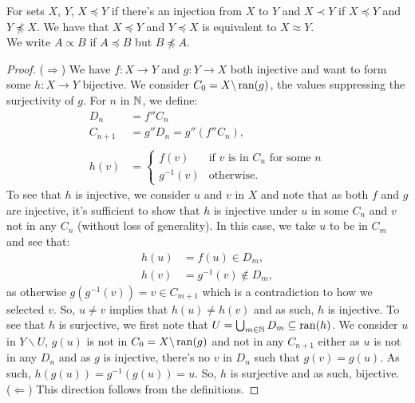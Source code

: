 For sets $X$, $Y$, $X \preceq Y$ if there's an injection from $X$ to $Y$
and $X \prec Y$ if $X \preceq Y$ and $Y \npreceq X$.
We have that $X \preceq Y$ and $Y \preceq X$ is equivalent
to $X \approx Y$.
\\[\baselineskip]
We write $A \propto B$ if $A \preceq B$ but $B \npreceq A$.

\newpage

\begin{proof}
    ($\Rightarrow$) We have $f : X \to Y$ and $g : Y \to X$ both
    injective and want to form some $h : X \to Y$ bijective.
    We consider $C_0 = X \backslash \operatorname{ran}(g)$, the values suppressing
    the surjectivity of $g$. For $n$ in $\mathbb{N}$, we define: \begin{align*}
        D_{n}     &= f''C_n \\
        C_{n + 1} &= g''D_n = g''(f''C_n), \\
        \\
        h(v) &= \begin{cases}
            f(v) & \text{if $v$ is in $C_n$ for some $n$} \\
            g^{-1}(v) & \text{otherwise.}
        \end{cases}
    \end{align*} To see that $h$ is injective, we consider $u$ and $v$ in
    $X$ and note that as both $f$ and $g$ are injective, it's sufficient to
    show that $h$ is injective under $u$ in some $C_n$ and $v$ not in any
    $C_n$ (without loss of generality). In this case, we take $u$ to be in $C_m$ 
    and see that: \begin{align*}
        h(u) &= f(u) \in D_m, \\
        h(v) &= g^{-1}(v) \notin D_m,
    \end{align*} as otherwise $g(g^{-1}(v)) = v \in C_{m + 1}$ which is
    a contradiction to how we selected $v$. So, $u \neq v$ implies that
    $h(u) \neq h(v)$ and as such, $h$ is injective. To see that $h$ is
    surjective, we first note that $U = \bigcup_{m \in \mathbb{N}} D_m \subseteq \operatorname{ran}(h)$.
    We consider $u$ in $Y \backslash U$, $g(u)$ is not in $C_0 = X \backslash \operatorname{ran}(g)$
    and not in any $C_{n + 1}$ either as $u$ is not in any $D_n$ and as $g$ is
    injective, there's no $v$ in $D_n$ such that $g(v) = g(u)$. As such,
    $h(g(u)) = g^{-1}(g(u)) = u$. So, $h$ is surjective and as such, bijective.
    \\[\baselineskip]
    ($\Leftarrow$) This direction follows from the definitions.
\end{proof}

